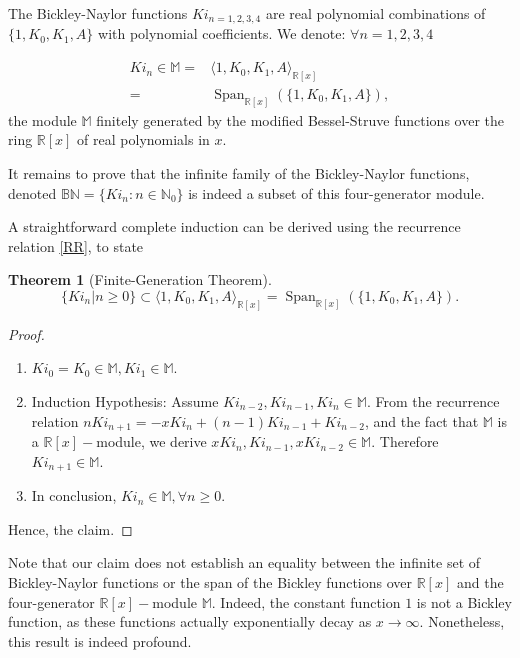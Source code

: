 \documentclass[pdflatex,sn-mathphys-num]{sn-jnl}%
\theoremstyle{thmstyleone}%
\newtheorem{theorem}{Theorem}%
\theoremstyle{thmstyletwo}%
\theoremstyle{thmstylethree}%
\begin{document}
The Bickley-Naylor functions $Ki_{n=1,2,3,4}$ are real polynomial combinations of $\{1, K_0, K_1, A\}$ with polynomial coefficients. We denote: $\forall n=1,2,3, 4$ 

\begin{equation}
\begin{split}
Ki_n \in \mathbb{M} = & \langle 1,K_0, K_1, A \rangle _{\mathbb{R}[x]}\\
 = & \operatorname{Span}_{\mathbb{R}[x]}(\{1,K_0,K_1,A\}),  
\end{split}
\end{equation}
the module $\mathbb{M}$ finitely generated by the modified Bessel-Struve functions over the ring $\mathbb{R}[x]$ of real polynomials in $x.$

It remains to prove that the infinite family of the Bickley-Naylor functions, denoted $\mathbb{BN}=
\{Ki_n:n\in\mathbb{N}_0 \}$ is indeed  a subset of this four-generator module. 

A straightforward complete induction can be derived using the recurrence relation \eqref{RR}, to state

\begin{theorem}[Finite-Generation Theorem]

\begin{equation}
\{Ki_n|n\ge 0 \} \subset  \langle 1,K_0, K_1, A\rangle_{\mathbb{R}[x]}=\operatorname{Span}_{\mathbb{R}[x]}(\{1,K_0,K_1,A\}).
\end{equation}
\end{theorem}

\begin{proof} \noindent
\begin{enumerate}
\item $Ki_0 = K_0 \in \mathbb{M}, Ki_1 \in \mathbb{M}.$
\item Induction Hypothesis: Assume $ Ki_{n-2}, Ki_{n-1}, Ki_n \in \mathbb{M}.$ From the recurrence relation $nKi_{n+1}=-xKi_n+(n-1)Ki_{n-1}+Ki_{n-2}$, and the fact that $\mathbb{M}$ is a $\mathbb{R}[x]-$module, we derive $xKi_n, Ki_{n-1}, xKi_{n-2} \in \mathbb{M}.$ Therefore $Ki_{n+1} \in \mathbb{M}.$
\item In conclusion, $Ki_n\in\mathbb{M}, \forall n \ge 0 .$
\end{enumerate}
Hence, the claim.
\end{proof}

Note that our claim does not establish an equality between the infinite set of Bickley-Naylor functions or the span of the Bickley functions over $\mathbb{R}[x]$ and the four-generator $\mathbb{R}[x]-$module $\mathbb{M}$. Indeed, the constant function $1$ is not a Bickley function, as these functions actually  exponentially decay as $x \rightarrow \infty.$
Nonetheless, this result is indeed profound. 
 
\end{document}
